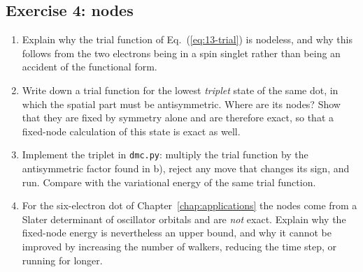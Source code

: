 \subsection*{Exercise 4: nodes}
\label{ex:15-nodes}

\begin{enumerate}
\item[a)] Explain why the trial function of Eq.~(\ref{eq:13-trial}) is
  nodeless, and why this follows from the two electrons being in a spin
  singlet rather than being an accident of the functional form.

\item[b)] Write down a trial function for the lowest \emph{triplet} state of
  the same dot, in which the spatial part must be antisymmetric.  Where are
  its nodes?  Show that they are fixed by symmetry alone and are therefore
  exact, so that a fixed-node calculation of this state is exact as well.

\item[c)] Implement the triplet in \texttt{dmc.py}: multiply the trial
  function by the antisymmetric factor found in b), reject any move that
  changes its sign, and run.  Compare with the variational energy of the same
  trial function.

\item[d)] For the six-electron dot of Chapter~\ref{chap:applications} the
  nodes come from a Slater determinant of oscillator orbitals and are
  \emph{not} exact.  Explain why the fixed-node energy is nevertheless an
  upper bound, and why it cannot be improved by increasing the number of
  walkers, reducing the time step, or running for longer.
\end{enumerate}
